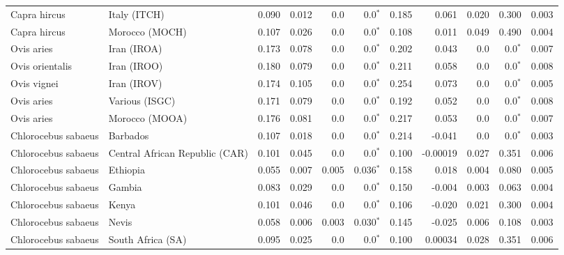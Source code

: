 \documentclass{article}
\begin{document}
\begin{table*}[!ht]
\begin{adjustbox}{width = 1\textwidth}
\begin{tabular}{|l|l|r|r|r|r|r|r|r|r|r|}
			\rowcolor{LIGHTGREY} Capra hircus & Italy (ITCH) & 0.090 & 0.012 & 0.0 & 0.0$\bm{^*}$ & 0.185 & 0.061 & 0.020 & 0.300\hspace{5pt} & 0.003 \\
			\rowcolor{LIGHTGREY} Capra hircus & Morocco (MOCH) & 0.107 & 0.026 & 0.0 & 0.0$\bm{^*}$ & 0.108 & 0.011 & 0.049 & 0.490\hspace{5pt} & 0.004 \\ \hline
			Ovis aries & Iran (IROA) & 0.173 & 0.078 & 0.0 & 0.0$\bm{^*}$ & 0.202 & 0.043 & 0.0 & 0.0$\bm{^*}$ & 0.007 \\
			Ovis orientalis & Iran (IROO) & 0.180 & 0.079 & 0.0 & 0.0$\bm{^*}$ & 0.211 & 0.058 & 0.0 & 0.0$\bm{^*}$ & 0.008 \\
			Ovis vignei & Iran (IROV) & 0.174 & 0.105 & 0.0 & 0.0$\bm{^*}$ & 0.254 & 0.073 & 0.0 & 0.0$\bm{^*}$ & 0.005 \\
			Ovis aries & Various (ISGC) & 0.171 & 0.079 & 0.0 & 0.0$\bm{^*}$ & 0.192 & 0.052 & 0.0 & 0.0$\bm{^*}$ & 0.008 \\
			Ovis aries & Morocco (MOOA) & 0.176 & 0.081 & 0.0 & 0.0$\bm{^*}$ & 0.217 & 0.053 & 0.0 & 0.0$\bm{^*}$ & 0.007 \\ \hline
			\rowcolor{LIGHTGREY} Chlorocebus sabaeus & Barbados & 0.107 & 0.018 & 0.0 & 0.0$\bm{^*}$ & 0.214 & -0.041 & 0.0 & 0.0$\bm{^*}$ & 0.003 \\
			\rowcolor{LIGHTGREY} Chlorocebus sabaeus & Central African Republic (CAR) & 0.101 & 0.045 & 0.0 & 0.0$\bm{^*}$ & 0.100 & -0.00019 & 0.027 & 0.351\hspace{5pt} & 0.006 \\
			\rowcolor{LIGHTGREY} Chlorocebus sabaeus & Ethiopia & 0.055 & 0.007 & 0.005 & 0.036$\bm{^*}$ & 0.158 & 0.018 & 0.004 & 0.080\hspace{5pt} & 0.005 \\
			\rowcolor{LIGHTGREY} Chlorocebus sabaeus & Gambia & 0.083 & 0.029 & 0.0 & 0.0$\bm{^*}$ & 0.150 & -0.004 & 0.003 & 0.063\hspace{5pt} & 0.004 \\
			\rowcolor{LIGHTGREY} Chlorocebus sabaeus & Kenya & 0.101 & 0.046 & 0.0 & 0.0$\bm{^*}$ & 0.106 & -0.020 & 0.021 & 0.300\hspace{5pt} & 0.004 \\
			\rowcolor{LIGHTGREY} Chlorocebus sabaeus & Nevis & 0.058 & 0.006 & 0.003 & 0.030$\bm{^*}$ & 0.145 & -0.025 & 0.006 & 0.108\hspace{5pt} & 0.003 \\
			\rowcolor{LIGHTGREY} Chlorocebus sabaeus & South Africa (SA) & 0.095 & 0.025 & 0.0 & 0.0$\bm{^*}$ & 0.100 & 0.00034 & 0.028 & 0.351\hspace{5pt} & 0.006 \\

\end{tabular}
\end{adjustbox}
\end{table*}
\end{document}
